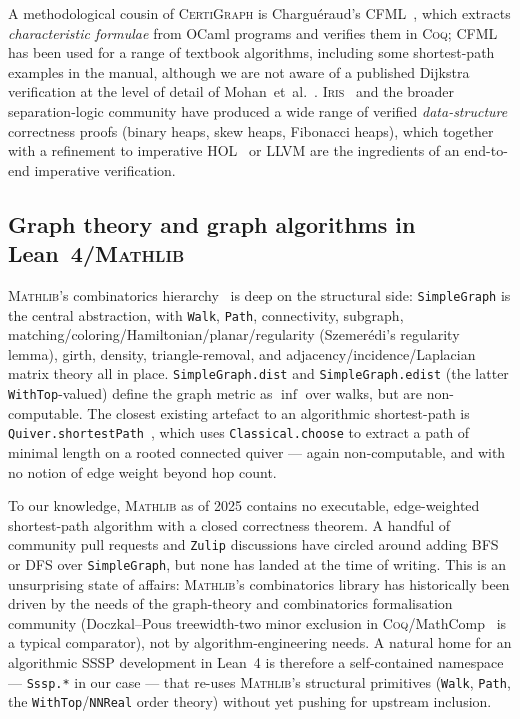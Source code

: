 \documentclass[11pt,a4paper]{article}
\newcommand{\Lean}{Lean~4\xspace}
\newcommand{\Mathlib}{\textsc{Mathlib}\xspace}
\newcommand{\Dijkstra}{Dijkstra\xspace}
\newcommand{\code}[1]{\texttt{#1}}
\theoremstyle{plain}
\theoremstyle{definition}
\begin{document}
A methodological cousin of \textsc{CertiGraph} is Charguéraud's
\textsc{CFML}~\cite{Charguraud2011CFML}, which extracts \emph{characteristic
formulae} from OCaml programs and verifies them in \textsc{Coq};
\textsc{CFML} has been used for a range of textbook algorithms, including
some shortest-path examples in the manual, although we are not aware of a
published \Dijkstra{} verification at the level of detail of
Mohan~et~al.~\cite{MohanLeowHobor2021}.
\textsc{Iris}~\cite{JungRustBelt2018} and the broader separation-logic
community have produced a wide range of verified \emph{data-structure}
correctness proofs (binary heaps, skew heaps, Fibonacci heaps), which
together with a refinement to imperative
HOL~\cite{Lammich2019JAR,Lammich2019LLVM} or LLVM are the ingredients of an
end-to-end imperative verification.

\subsection{Graph theory and graph algorithms in \Lean{}/\Mathlib}\label{sec:rel-graph-lean}

\Mathlib's combinatorics hierarchy~\cite{Mathlib2020,MathlibSimpleGraph} is
deep on the structural side: \code{SimpleGraph} is the central abstraction,
with \code{Walk}, \code{Path}, connectivity, subgraph,
matching/coloring/Hamiltonian/planar/regularity (Szemerédi's regularity
lemma), girth, density, triangle-removal, and adjacency/incidence/Laplacian
matrix theory all in place. \code{SimpleGraph.dist} and
\code{SimpleGraph.edist} (the latter \code{WithTop}-valued) define the
graph metric as $\inf$ over walks, but are non-computable. The closest
existing artefact to an algorithmic shortest-path is
\code{Quiver.shortestPath}~\cite{MathlibQuiver}, which uses
\code{Classical.choose} to extract a path of minimal length on a rooted
connected quiver --- again non-computable, and with no notion of edge
weight beyond hop count.

To our knowledge, \Mathlib{} as of 2025 contains no executable, edge-weighted
shortest-path algorithm with a closed correctness theorem. A handful of
community pull requests and \texttt{Zulip} discussions have circled around
adding BFS or DFS over \code{SimpleGraph}, but none has landed at the time
of writing. This is an unsurprising state of affairs: \Mathlib{}'s
combinatorics library has historically been driven by the needs of the
graph-theory and combinatorics formalisation community
(Doczkal--Pous treewidth-two minor exclusion in \textsc{Coq}/MathComp~\cite{DoczkalPous2020Minor}
is a typical comparator), not by algorithm-engineering needs. A natural
home for an algorithmic SSSP development in \Lean{} is therefore a
self-contained namespace --- \code{Sssp.*} in our case --- that re-uses
\Mathlib's structural primitives (\code{Walk}, \code{Path}, the
\code{WithTop}/\code{NNReal} order theory) without yet pushing for upstream
inclusion.
\end{document}
